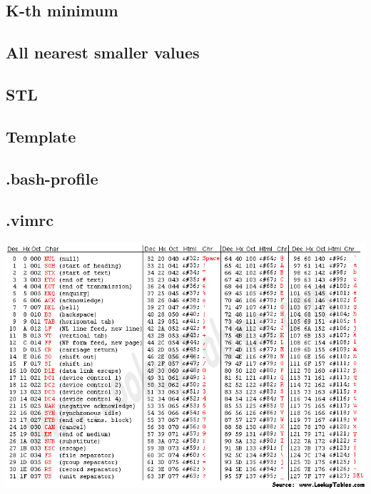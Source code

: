 \documentclass[a4paper]{article}
\begin{document}
    \subsection{K-th minimum}
        
    \subsection{All nearest smaller values}
        
    \subsection{STL}
        
    \subsection{Template}
        
    \subsection{.bash-profile}
        
    \subsection{.vimrc}
        
    \includegraphics[width=\linewidth]{../other/asciifull.png}

\end{document}
